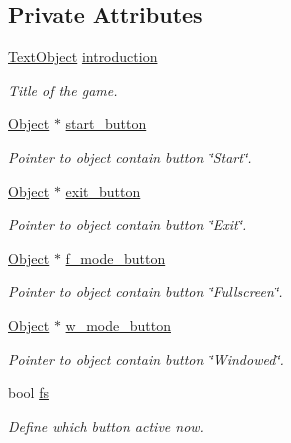 \subsection*{Private Attributes}
\begin{DoxyCompactItemize}
\item 
\mbox{\label{class_main_menu_a2202aa0a009aaa8593766768934f2ed2}} 
\hyperlink{class_text_object}{Text\+Object} \hyperlink{class_main_menu_a2202aa0a009aaa8593766768934f2ed2}{introduction}
\begin{DoxyCompactList}\small\item\em Title of the game. \end{DoxyCompactList}\item 
\mbox{\label{class_main_menu_a49c056eefba301d78aff8840fd376cc7}} 
\hyperlink{class_object}{Object} $\ast$ \hyperlink{class_main_menu_a49c056eefba301d78aff8840fd376cc7}{start\+\_\+button}
\begin{DoxyCompactList}\small\item\em Pointer to object contain button \char`\"{}\+Start\char`\"{}. \end{DoxyCompactList}\item 
\mbox{\label{class_main_menu_aaa1f9030ef6aedef97961b5da7dde06a}} 
\hyperlink{class_object}{Object} $\ast$ \hyperlink{class_main_menu_aaa1f9030ef6aedef97961b5da7dde06a}{exit\+\_\+button}
\begin{DoxyCompactList}\small\item\em Pointer to object contain button \char`\"{}\+Exit\char`\"{}. \end{DoxyCompactList}\item 
\mbox{\label{class_main_menu_a6de7ff52312a688a795acbe4baddb781}} 
\hyperlink{class_object}{Object} $\ast$ \hyperlink{class_main_menu_a6de7ff52312a688a795acbe4baddb781}{f\+\_\+mode\+\_\+button}
\begin{DoxyCompactList}\small\item\em Pointer to object contain button \char`\"{}\+Fullscreen\char`\"{}. \end{DoxyCompactList}\item 
\mbox{\label{class_main_menu_a61f684f61f99383c58f4fc09c50b1f9d}} 
\hyperlink{class_object}{Object} $\ast$ \hyperlink{class_main_menu_a61f684f61f99383c58f4fc09c50b1f9d}{w\+\_\+mode\+\_\+button}
\begin{DoxyCompactList}\small\item\em Pointer to object contain button \char`\"{}\+Windowed\char`\"{}. \end{DoxyCompactList}\item 
bool \hyperlink{class_main_menu_a22890c1716e56c182b500088c13d7f34}{fs}
\begin{DoxyCompactList}\small\item\em Define which button active now. \end{DoxyCompactList}\end{DoxyCompactItemize}
